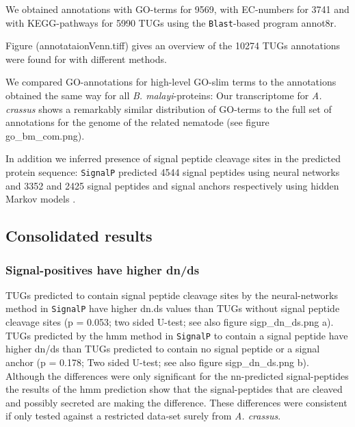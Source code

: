 \documentclass[10pt]{bmc_article}
\newenvironment{bmcformat}{\begin{raggedright}\baselineskip20pt\sloppy\setboolean{publ}{false}}{\end{raggedright}\baselineskip20pt\sloppy}
\begin{document}
\begin{bmcformat}





We obtained annotations with GO-terms for 9569, with EC-numbers
for 3741 and with KEGG-pathways for 5990 TUGs using
the \texttt{Blast}-based program annot8r.

Figure (annotataionVenn.tiff) gives an overview of the
10274 TUGs annotations were found for with
different methods.


We compared GO-annotations for high-level GO-slim terms to the
annotations obtained the same way for all \textit{B. malayi}-proteins:
Our transcriptome for \textit{A. crassus} shows a remarkably similar
distribution of GO-terms to the full set of annotations for the genome
of the related nematode (see figure go\_bm\_com.png).

In addition we inferred presence of signal peptide cleavage sites in
the predicted protein sequence: \texttt{SignalP} \cite{pmid17446895}
predicted 4544 signal peptides using neural networks and
3352 and 2425 signal peptides and signal anchors
respectively using hidden Markov models \cite{pmid9783217}.

\subsection*{Consolidated results}





\subsubsection*{Signal-positives have higher dn/ds}

TUGs predicted to contain signal peptide cleavage sites by the
neural-networks method in \texttt{SignalP} have higher dn.ds values
than TUGs without signal peptide cleavage sites (p =
0.053; two sided U-test; see also
figure sigp\_dn\_ds.png a). TUGs predicted by the hmm method in
\texttt{SignalP} to contain a signal peptide have higher dn/ds than
TUGs predicted to contain no signal peptide or a signal anchor (p =
0.178; Two sided U-test; see also
figure sigp\_dn\_ds.png b). Although the differences were only
significant for the nn-predicted signal-peptides the results of the
hmm prediction show that the signal-peptides that are cleaved and
possibly secreted are making the difference. These differences were
consistent if only tested against a restricted data-set surely from
\textit{A. crassus}.


\end{bmcformat}
\end{document}
